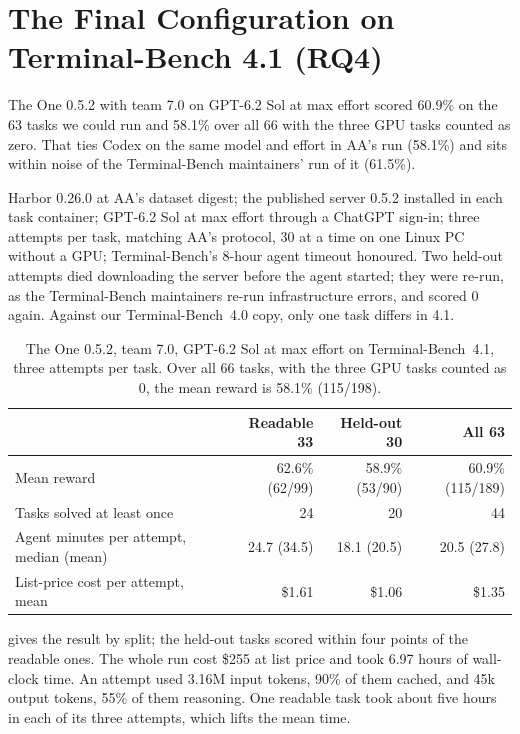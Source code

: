 \section{The Final Configuration on Terminal-Bench 4.1 (RQ4)}
\label{sec:tb41}

The One 0.5.2 with team 7.0 on GPT-6.2 Sol at max effort scored 60.9\% on the 63 tasks we could
run and 58.1\% over all 66 with the three GPU tasks counted as zero. That ties Codex on the same
model and effort in AA's run (58.1\%) and sits within noise of the Terminal-Bench maintainers' run
of it (61.5\%).

 Harbor 0.26.0 at AA's dataset digest; the published server 0.5.2 installed in each
task container; GPT-6.2 Sol at max effort through a ChatGPT sign-in; three attempts per task,
matching AA's protocol, 30 at a time on one Linux PC without a GPU; Terminal-Bench's 8-hour agent
timeout honoured. Two held-out attempts died downloading the server before the agent started; they
were re-run, as the Terminal-Bench maintainers re-run infrastructure errors, and scored 0 again.
Against our Terminal-Bench~4.0 copy, only one task differs in 4.1.

\begin{table}[t]
\centering
\small
\caption{The One 0.5.2, team 7.0, GPT-6.2 Sol at max effort on Terminal-Bench~4.1, three attempts per
task. Over all 66 tasks, with the three GPU tasks counted as 0, the mean reward is 58.1\% (115/198).}
\label{tab:tb41}
\begin{tabular}{@{}lrrr@{}}
\toprule
 & Readable 33 & Held-out 30 & All 63 \\
\midrule
Mean reward & 62.6\% (62/99) & 58.9\% (53/90) & 60.9\% (115/189) \\
Tasks solved at least once & 24 & 20 & 44 \\
Agent minutes per attempt, median (mean) & 24.7 (34.5) & 18.1 (20.5) & 20.5 (27.8) \\
List-price cost per attempt, mean & \$1.61 & \$1.06 & \$1.35 \\
\bottomrule
\end{tabular}
\end{table}

 gives the result by split; the held-out tasks scored within four points of the
readable ones. The whole run cost \$255 at
list price and took 6.97 hours of wall-clock time. An attempt used 3.16M input tokens, 90\% of them
cached, and 45k output tokens, 55\% of them reasoning. One readable task took about five hours in
each of its three attempts, which lifts the mean time.

